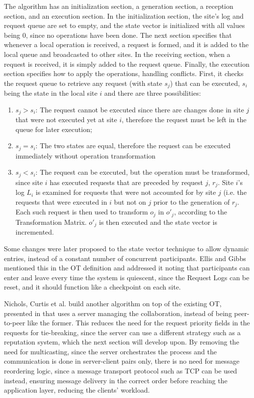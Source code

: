 The algorithm has an initialization section, a generation section, a reception section, and an execution section.
In the initialization section, the site's log and request queue are set to empty, and the state vector is initialized with all values being 0, since no operations have been done. The next section specifies that whenever a local operation is received, a request is formed, and it is added to the local queue and broadcasted to other sites. In the receiving section, when a request is received, it is simply added to the request queue. Finally, the execution section specifies how to apply the operations, handling conflicts. First, it checks the request queue to retrieve any request (with state $s_j$) that can be executed, $s_i$ being the state in the local site $i$ and there are three possibilities:

\begin{enumerate}
    \item $s_j > s_i$: The request cannot be executed since there are changes done in site $j$ that were not executed yet at site $i$, therefore the request must be left in the queue for later execution;
    \item $s_j = s_i$: The two states are equal, therefore the request can be executed immediately without operation transformation
    \item $s_j < s_i$: The request can be executed, but the operation must be transformed, since site $i$ has executed requests that are preceded by request $j$, $r_j$. Site $i$'s log $L_i$ is examined for requests that were not accounted for by site $j$ (i.e. the requests that were executed in $i$ but not on $j$ prior to the generation of $r_j$. Each such request is then used to transform $o_j$ in $o'_j$, according to the Transformation Matrix. $o'_j$ is then executed and the state vector is incremented.
\end{enumerate}

Some changes were later proposed to the state vector technique \cite{Landes2006} \cite{Almeida2008} to allow dynamic entries, instead of a constant number of concurrent participants. Ellis and Gibbs \cite{Ellis1989} mentioned this in the OT definition and addressed it noting that participants can enter and leave every time the system is quiescent, since the Request Logs can be reset, and it should function like a checkpoint on each site.

Nichols, Curtis et al. \cite{Nichols1995} build another algorithm on top of the existing OT, presented in \cite{Ellis1989} that uses a server managing the collaboration, instead of being peer-to-peer like the former. This reduces the need for the request priority fields in the requests for tie-breaking, since the server can use a different strategy such as a reputation system, which the next section will develop upon. By removing the need for multicasting, since the server orchestrates the process and the communication is done in server-client pairs only, there is no need for message reordering logic, since a message transport protocol such as TCP \cite{tcpprotocol} can be used instead, ensuring message delivery in the correct order before reaching the application layer, reducing the clients' workload.

